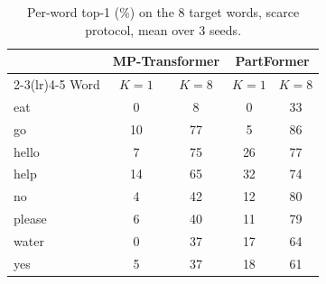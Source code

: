 \begin{table}[t]
\centering
\small
\caption{Per-word top-1 (\%) on the 8 target words, scarce protocol, mean over 3 seeds.}
\label{tab:perword}
\begin{tabular}{lcccc}
\toprule
 & \multicolumn{2}{c}{MP-Transformer} & \multicolumn{2}{c}{PartFormer} \\
\cmidrule(lr){2-3}\cmidrule(lr){4-5}
Word & $K=1$ & $K=8$ & $K=1$ & $K=8$ \\
\midrule
eat & 0 & 8 & 0 & 33 \\
go & 10 & 77 & 5 & 86 \\
hello & 7 & 75 & 26 & 77 \\
help & 14 & 65 & 32 & 74 \\
no & 4 & 42 & 12 & 80 \\
please & 6 & 40 & 11 & 79 \\
water & 0 & 37 & 17 & 64 \\
yes & 5 & 37 & 18 & 61 \\
\bottomrule
\end{tabular}
\end{table}
